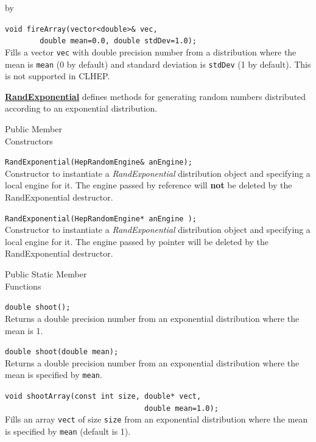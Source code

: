 \documentclass[twoside]{article}
\newcommand{\comp}[1]{\texttt{#1}}%
\newcommand{\entrylabel}[1]{\mbox{\textbf{{#1}}}\hfil}%
\newenvironment{entry}
{\begin{list}{}%
    {\renewcommand{\makelabel}{\entrylabel}%
     \setlength{\labelwidth}{90pt}%
     \setlength{\leftmargin}{\labelwidth}
     \advance\leftmargin by \labelsep%
      }%
    }%
  {\end{list}}
\newcommand{\Entrylabel}[1]%
{\raisebox{0pt}[1ex][0pt]{\makebox[\labelwidth][l]%
    {\parbox[t]{\labelwidth}{\hspace{0pt}\textbf{{#1}}}}}}
\newenvironment{Entry}%
{\renewcommand{\entrylabel}{\Entrylabel}\begin{entry}}%
  {\end{entry}}
\begin{document}
\begin{description}
\begin{Entry}
  \verb+void fireArray(vector<double>& vec,+\\
  \verb+        double mean=0.0, double stdDev=1.0);+\\
  Fills a vector \comp{vec} with double
  precision number from a distribution where the
  mean is \comp{mean} (0 by default) and standard
  deviation is \comp{stdDev} (1 by default).  This is not
  supported in CLHEP.
  
  \begin{description}
      \item \underline{\bf RandExponential}  defines methods for generating
        random numbers distributed according to an exponential distribution.
  \end{description}
      
\item[Public Member\\ Constructors]

   \verb+RandExponential(HepRandomEngine& anEngine);+\\
   Constructor to instantiate a {\em RandExponential}
   distribution object and specifying a local engine for it.
   The engine passed by reference will {\bf not} be deleted by
   the RandExponential destructor.
   
   \verb+RandExponential(HepRandomEngine* anEngine );+\\
   Constructor to instantiate a {\em RandExponential}
   distribution object and specifying a local engine for it.
   The engine passed by pointer will be deleted by the RandExponential
   destructor.

\item[Public Static Member\\ Functions]

   \verb+double shoot();+\\
   Returns a double precision number from an exponential distribution where the
   mean is 1.
  
   \verb+double shoot(double mean);+\\
   Returns a double precision number from an exponential distribution where the
   mean is specified by \comp{mean}.
  
   \verb+void shootArray(const int size, double* vect,+\\
   \verb+                                double mean=1.0);+\\
   Fills an array \comp{vect} of size \comp{size} from an exponential distribution
   where the mean is specified by \comp{mean} (default is 1).


\end{Entry}
\end{description}
\end{document}
